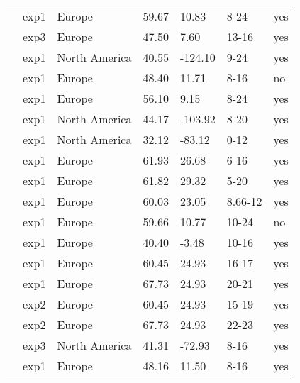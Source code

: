 \documentclass{article}
\begin{document}
\begin{footnotesize}
\begin{table}[ht]
\begin{tabular}{|p{}|p{}|p{}|p{}|p{}|p{}|p{}|}
  \citet{Heide:1993a} & exp1 & Europe & 59.67 & 10.83 & 8-24 & yes \\ 
  \citet{Heide:1993a} & exp3 & Europe & 47.50 & 7.60 & 13-16 & yes \\ 
  \citet{Howe:1995aa} & exp1 & North America & 40.55 & -124.10 & 9-24 & yes \\ 
  \citet{Laube:2014a} & exp1 & Europe & 48.40 & 11.71 & 8-16 & no \\ 
  \citet{Myking:1995} & exp1 & Europe & 56.10 & 9.15 & 8-24 & yes \\ 
  \citet{Nienstaedt:1966aa} & exp1 & North America & 44.17 & -103.92 & 8-20 & yes \\ 
  \citet{Okie:2011aa} & exp1 & North America & 32.12 & -83.12 & 0-12 & yes \\ 
  \citet{Partanen:2001aa} & exp1 & Europe & 61.93 & 26.68 & 6-16 & yes \\ 
  \citet{Partanen:2005aa} & exp1 & Europe & 61.82 & 29.32 & 5-20 & yes \\ 
  \citet{Partanen:1998aa} & exp1 & Europe & 60.03 & 23.05 & 8.66-12 & yes \\ 
  \citet{Pettersen:1972aa} & exp1 & Europe & 59.66 & 10.77 & 10-24 & no \\ 
  \citet{Sanz-Perez:2009aa} & exp1 & Europe & 40.40 & -3.48 & 10-16 & yes \\ 
  \citet{Vihera-Aarnio:2006aa} & exp1 & Europe & 60.45 & 24.93 & 16-17 & yes \\ 
  \citet{Vihera-Aarnio:2006aa} & exp1 & Europe & 67.73 & 24.93 & 20-21 & yes \\ 
  \citet{Vihera-Aarnio:2006aa} & exp2 & Europe & 60.45 & 24.93 & 15-19 & yes \\ 
  \citet{Vihera-Aarnio:2006aa} & exp2 & Europe & 67.73 & 24.93 & 22-23 & yes \\ 
  \citet{Worrall:1967aa} & exp3 & North America & 41.31 & -72.93 & 8-16 & yes \\ 
  \citet{zohner2016} & exp1 & Europe & 48.16 & 11.50 & 8-16 & yes \\ 
   \hline
\end{tabular}
\endgroup
\end{table}\end{footnotesize} 
\end{document}
